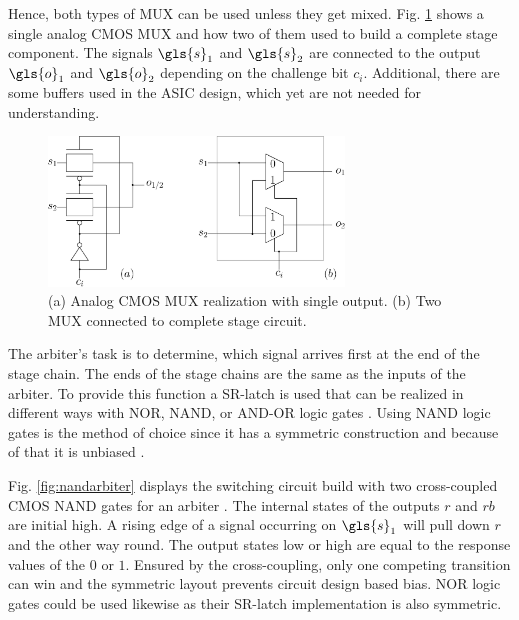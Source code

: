 Hence, both types of \ac{MUX} can be used unless they get mixed.
Fig. \ref{fig:multiplexer} shows a single analog \ac{CMOS} \ac{MUX} and how two of them used to build a complete stage component. %
The signals $\gls{s}_1$ and $\gls{s}_2$ are connected to the output $\gls{o}_1$ and $\gls{o}_2$ depending on the challenge bit $c_i$.
Additional, there are some buffers used in the \ac{ASIC} design, which yet are not needed for understanding.

\begin{figure}[ht]
\centering
\includegraphics[width=0.70\textwidth]{images/stage_circuit.eps}
\caption[Analog \acs{MUX} and stage circuit]{(a) Analog \ac{CMOS} \ac{MUX} realization with single output.
(b) Two \acs{MUX} connected to complete stage circuit.}
\label{fig:multiplexer}
\end{figure}

The arbiter's task is to determine, which signal arrives first at the end of the stage chain.
The ends of the stage chains are the same as the inputs of the arbiter. %
To provide this function a \ac{SR-latch} is used that can be realized in different ways with NOR, NAND, or AND-OR logic gates \cite{Wikipedia2016Flip-flopelectronics}.
Using NAND logic gates is the method of choice since it has a symmetric construction and because of that it is unbiased \cite{Lin2010Low-powerFunctions,Maes2013PhysicallyApplications}.

Fig. \ref{fig:nandarbiter} displays the switching circuit build with two cross-coupled \ac{CMOS} NAND gates for an arbiter \cite{Wikipedia2016NANDGate}.
The internal states of the outputs $r$ and $rb$ are initial high. 
A rising edge of a signal occurring on $\gls{s}_1$ will pull down $r$ and the other way round.
The output states low or high are equal to the response values of the \puf $0$ or $1$. %
Ensured by the cross-coupling, only one competing transition can win and the symmetric layout prevents circuit design based bias.
NOR logic gates could be used likewise as their \ac{SR-latch} implementation is also symmetric.

